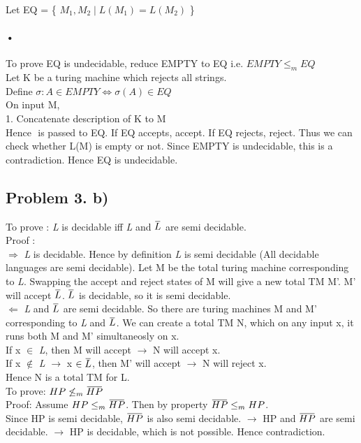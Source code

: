 \documentclass[12pt]{article}
\newcommand{\overbar}[1]{\mkern 1.5mu\overline{\mkern-1.5mu#1\mkern-1.5mu}\mkern 1.5mu}
\begin{document}
	Let EQ = \{ \( M_{1},M_{2} \mid L(M_{1}) = L(M_{2})\) \} 
	\paragraph{•}
	To prove EQ is undecidable, reduce EMPTY to EQ i.e. \(EMPTY \leq _{m} EQ\) \\
	Let K be a turing machine which rejects all strings. \\
	Define \( \sigma : A \in EMPTY \Leftrightarrow \sigma (A) \in EQ \) \\
	On input M,\\
	1. Concatenate description of K to M\\
	Hence \(<M,K>\) is passed to EQ. If EQ accepts, accept. If EQ rejects, reject. Thus we can check whether L(M) is empty or not. Since EMPTY is undecidable, this is a contradiction.
	Hence EQ is undecidable.
	\\
	
\subsection{Problem 3. b)}

	To prove : \textit{L} is decidable iff \textit{L} and \(\overbar{L}\) are semi decidable.\\
	Proof :	\\
		\(\Rightarrow\) \textit{L} is decidable. Hence by definition \textit{L} is semi decidable (All decidable languages are semi decidable). Let M be the total turing machine corresponding to \textit{L}. Swapping the accept and reject states of M will give a new total TM M'. M' will accept \(\overbar{L}\). \(\overbar{L}\) is decidable, so it is semi decidable.\\
	\(\Leftarrow\) \textit{L} and \(\overbar{L}\) are semi decidable. So there are turing machines M and M' corresponding to \textit{L} and \(\overbar{L}\). We can create a total TM N, which on any input x, it runs both M and M' simultaneosly on x. \\
	If x \(\in\) \textit{L}, then M will accept \(\rightarrow\) N will accept x. \\
	If x \(\not\in\) \textit{L} \(\rightarrow\) x \(\in \overbar{L}\), then M' will accept \(\rightarrow\) N will reject x.\\
	Hence N is a total TM for L.\\
	
	To prove: \(HP \not\leq _{m} \overbar{HP}\)\\
	Proof: Assume \(HP \leq _{m} \overbar{HP}\). Then by property \(\overbar{HP} \leq _{m} HP\).\\ Since HP is semi decidable, \(\overbar{HP}\) is also semi decidable. \(\rightarrow\) HP and \(\overbar{HP}\) are semi decidable.  \(\rightarrow\) HP is decidable, which is not possible. Hence contradiction.
	
\end{document}
